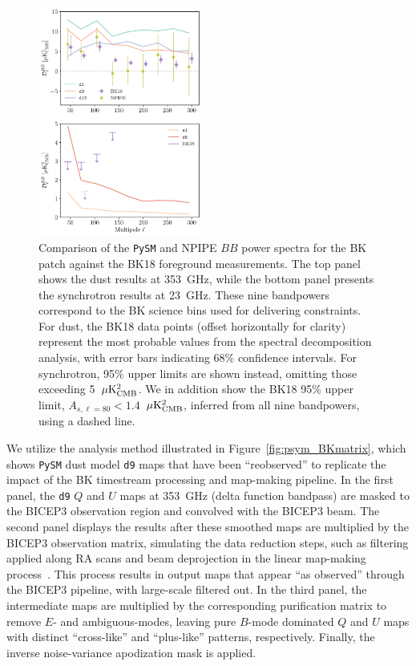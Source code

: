 \documentclass[twocolumn]{aastex631}
\begin{document}
\begin{figure}
    \centering
    \includegraphics[width=0.48\textwidth]{figures/BKfield_power.pdf}
    \caption{Comparison of the \texttt{PySM} and NPIPE $BB$ power spectra for the BK patch against the BK18 foreground measurements. The top panel shows the dust results at 353~GHz, while the bottom panel presents the synchrotron results at 23~GHz. These nine bandpowers correspond to the BK science bins used for delivering constraints. For dust, the BK18 data points (offset horizontally for clarity) represent the most probable values from the spectral decomposition analysis, with error bars indicating 68\% confidence intervals. For synchrotron, 95\% upper limits are shown instead, omitting those exceeding 5~$\mu\rm{K^2_{CMB}}$. We in addition show the BK18 95\% upper limit, $A_{s,\ell=80} < 1.4$~$\mu\rm{K^2_{CMB}}$, inferred from all nine bandpowers, using a dashed line.}
    \label{fig:BKfield_power}
\end{figure}

We utilize the analysis method illustrated in Figure~\ref{fig:psym_BKmatrix}, which shows \texttt{PySM} dust model \texttt{d9} maps that have been ``reobserved'' to replicate the impact of the BK timestream processing and map-making pipeline. In the first panel, the \texttt{d9} $Q$ and $U$ maps at 353~GHz (delta function bandpass) are masked to the BICEP3 observation region and convolved with the BICEP3 beam. The second panel displays the results after these smoothed maps are multiplied by the BICEP3 observation matrix, simulating the data reduction steps, such as filtering applied along RA scans and beam deprojection in the linear map-making process~\citep{BICEP2Collaboration:2016}. This process results in output maps that appear ``as observed'' through the BICEP3 pipeline, with large-scale filtered out. In the third panel, the intermediate maps are multiplied by the corresponding purification matrix to remove $E$- and ambiguous-modes, leaving pure $B$-mode dominated $Q$ and $U$ maps with distinct ``cross-like'' and ``plus-like'' patterns,  respectively. Finally, the inverse noise-variance apodization mask is applied. 
\end{document}
